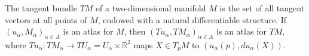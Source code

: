 The tangent bundle $TM$ of a two-dimensional manifold $M$ is the set of all tangent vectors at all points of $M$, endowed with a natural differentiable structure. If $(u_\alpha, M_\alpha)_{\alpha \in A}$ is an atlas for $M$, then $(Tu_\alpha, TM_\alpha)_{\alpha \in A}$ is an atlas for $TM$, where $Tu_\alpha: TM_\alpha \to T U_\alpha = U_\alpha \times \mathbb{R}^2$ maps $X \in T_p M$ to $(u_\alpha(p), du_\alpha(X))$.